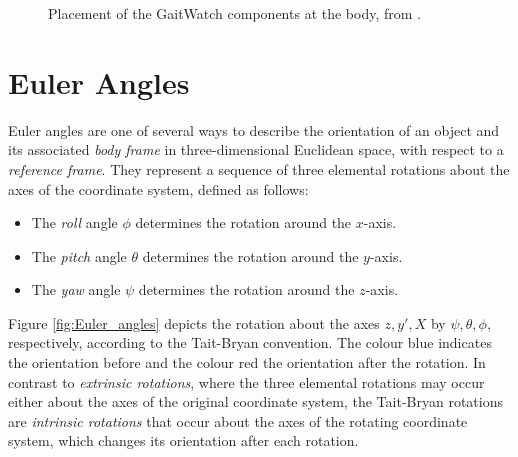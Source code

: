 \begin{figure}
\centering
{}
\caption{Placement of the GaitWatch components at the body, from \cite{olivares_vicente_gaitwatch_2013}.}
	\label{fig:GaitWatch_placement}
\end{figure}


\section{Euler Angles}

Euler angles are one of several ways to describe the orientation of an object and its associated \emph{body frame} in three-dimensional Euclidean space, with respect to a \emph{reference frame}. They represent a sequence of three elemental rotations about the axes of the coordinate system, defined as follows:

\begin{itemize}
\item The \emph{roll} angle $\phi$ determines the rotation around the $x$-axis.
\item The \emph{pitch} angle $\theta$ determines the rotation around the $y$-axis.
\item The \emph{yaw} angle $\psi$ determines the rotation around the $z$-axis.
\end{itemize}

\noindent
Figure \ref{fig:Euler_angles} depicts the rotation about the axes $z, y', X$ by $\psi, \theta, \phi$, respectively, according to the Tait-Bryan convention. The colour blue indicates the orientation before and the colour red the orientation after the rotation. In contrast to \emph{extrinsic rotations}, where the three elemental rotations may occur either about the axes of the original coordinate system, the Tait-Bryan rotations are \emph{intrinsic rotations} that occur about the axes of the rotating coordinate system, which changes its orientation after each rotation.

